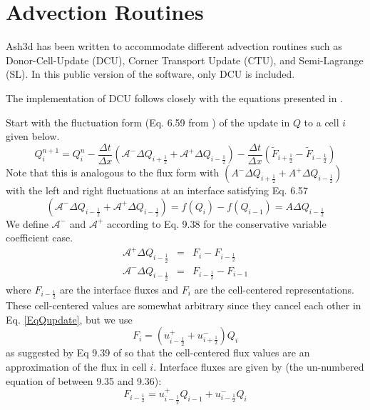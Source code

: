 \section{Advection Routines}
Ash3d has been written to accommodate different advection routines such as
Donor-Cell-Update (DCU), Corner Transport Update (CTU), and Semi-Lagrange (SL).
In this public version of the software, only DCU is included.

The implementation of DCU follows closely with the equations presented in
\cite{LeVeque2003}.

Start with the fluctuation form (Eq. 6.59 from \cite{LeVeque2003}) of the update in $Q$ to
a cell $i$ given below.
\begin{equation}\label{EqQupdate}
Q^{n+1}_i = Q^{n}_i - \frac{\Delta t}{\Delta x} 
\left( \mathcal{A}^{-} \Delta Q_{i+\frac{1}{2}} + \mathcal{A}^{+} \Delta Q_{i-\frac{1}{2}}\right) -
\frac{\Delta t}{\Delta x}
\left( \widetilde{F}_{i+\frac{1}{2}} - \widetilde{F}_{i-\frac{1}{2}}\right)
\end{equation}
Note that this is analogous to the flux form with
$(A^{-}\Delta Q_{i+\frac{1}{2}} + A^{+}\Delta Q_{i-\frac{1}{2}})$ with the left and
right fluctuations at an interface satisfying Eq. 6.57 
\begin{equation}\label{Eqflucdef}
(\mathcal{A}^{-}\Delta Q_{i-\frac{1}{2}} + \mathcal{A}^{+}\Delta Q_{i-\frac{1}{2}})=
f(Q_i)-f(Q_{i-1})= A \Delta Q_{i-\frac{1}{2}}
\end{equation}
We define $\mathcal{A}^{-}$ and $\mathcal{A}^{+}$ according to Eq. 9.38 for the
conservative variable coefficient case.
\begin{eqnarray}
\mathcal{A}^{+} \Delta Q_{i-\frac{1}{2}} &=& F_i - F_{i-\frac{1}{2}} \\
\mathcal{A}^{-} \Delta Q_{i-\frac{1}{2}} &=& F_{i-\frac{1}{2}} - F_{i-1}
\end{eqnarray}
where $F_{i-\frac{1}{2}}$ are the interface fluxes and $F_i$ are the cell-centered
representations.  These cell-centered values are somewhat arbitrary since they cancel
each other in Eq. \ref{EqQupdate}, but we use
\begin{equation}\label{Eqccfluxdef}
F_i = (u^{+}_{i-\frac{1}{2}} + u^{-}_{i+\frac{1}{2}})Q_i
\end{equation}
as suggested by
Eq 9.39 of \cite{LeVeque2003} so that the cell-centered flux values are an approximation of
the flux in cell $i$.  Interface fluxes are given by (the un-numbered
equation of \cite{LeVeque2003} between 9.35 and 9.36):
\begin{equation}\label{EqIntfluxdef}
F_{i-\frac{1}{2}} = u^{+}_{i-\frac{1}{2}} Q_{i-1} + u^{-}_{i-\frac{1}{2}} Q_{i}
\end{equation}
